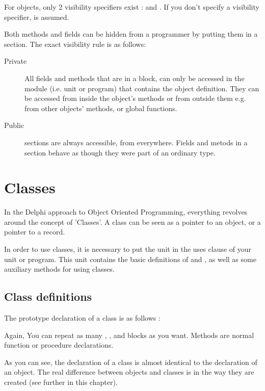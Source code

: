 \documentclass{report}
\begin{document}
For objects, only 2 visibility specifiers exist :  and 
. If you don't specify a visibility specifier,  
is assumed.

Both methods and fields can be hidden from a programmer by putting them
in a  section. The exact visibility rule is as follows:

\begin{description}
\item [Private\ ] All fields and methods that are in a  block, 
can  only be accessed in the module (i.e. unit or program) that contains 
the object definition.
They can be accessed from inside the object's methods or from outside them
e.g. from other objects' methods, or global functions.
\item [Public\ ] sections are always accessible, from everywhere.
Fields and metods in a  section behave as though they were part
of an ordinary  type.
\end{description}

\chapter{Classes}

In the Delphi approach to Object Oriented Programming, everything revolves
around  the concept of 'Classes'.  A class can be seen as a pointer to an 
object, or a pointer to a record. 

In order to use classes, it is necessary to put the  unit in the
uses clause of your unit or program. This unit contains the basic
definitions of  and , as well as some auxiliary
methods for using classes.

\section{Class definitions}
The prototype declaration of a class is as follows :



Again, You can repeat as many , ,   
and  blocks as you want. 
Methods are normal function or procedure declarations. 

As you can see, the declaration of a class is almost identical to the
declaration of an object. The real difference between objects and classes
is in the way they are created (see further in this chapter).
\end{document}
